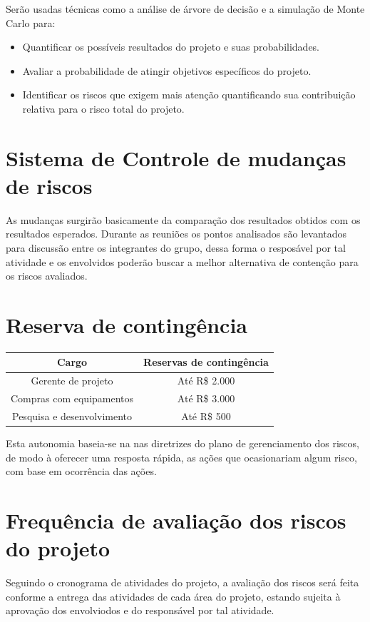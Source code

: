 Serão usadas técnicas como a análise de árvore de decisão e a simulação de Monte Carlo para:
\begin{itemize}
\item Quantificar os possíveis resultados do projeto e suas probabilidades.
\item Avaliar a probabilidade de atingir objetivos específicos do projeto.
\item Identificar os riscos que exigem mais atenção quantificando sua contribuição relativa para o risco total do projeto.

\end{itemize}

\section*{Sistema de Controle de mudanças de riscos}
As mudanças surgirão basicamente da comparação dos resultados obtidos com os resultados esperados. Durante as reuniões os pontos analisados são levantados para discussão entre os integrantes do grupo, dessa forma o resposável por tal atividade e os envolvidos poderão buscar a melhor alternativa de contenção para os riscos avaliados. 

\section*{Reserva de contingência}
\begin{table}[h]
\centering
\begin{tabular}{|c|c|}
Cargo & Reservas de contingência\\
\hline
Gerente de projeto & Até R\$ 2.000\\
\hline
Compras com equipamentos & Até R\$ 3.000\\
\hline
Pesquisa e desenvolvimento & Até R\$ 500\\
\hline
\end{tabular}
\end{table}

Esta autonomia baseia-se na nas diretrizes do plano de gerenciamento dos riscos, de modo à oferecer uma resposta rápida, as ações que ocasionariam algum risco, com base em ocorrência das ações. 
\section*{Frequência de avaliação dos riscos do projeto}
Seguindo o cronograma de atividades do projeto, a avaliação dos riscos será feita conforme a entrega das atividades de cada área do projeto, estando sujeita à aprovação dos envolviodos e do responsável por tal atividade.

